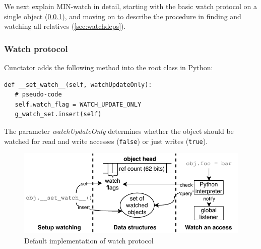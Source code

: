 \documentclass[sigconf]{acmart}\settopmatter{printfolios=true,printccs=false,printacmref=false}\setcopyright{none}
\begin{document}
We next explain MIN-watch in detail, starting with the basic watch protocol on a single object (\cref{sec:watchproto}), and moving on to describe the procedure in finding and watching all relatives (\cref{sec:watchdeps}). 


\subsubsection{Watch protocol}
\label{sec:watchproto}

Cunctator adds the following method into the root class in Python: 

\begin{lstlisting}[style=myPythonStyle]
def __set_watch__(self, watchUpdateOnly):
   # pseudo-code
   self.watch_flag = WATCH_UPDATE_ONLY
   g_watch_set.insert(self)
\end{lstlisting}

The parameter \textit{watchUpdateOnly} determines whether the object should be watched for read and write accesses (\texttt{false}) or just writes (\texttt{true}).


\begin{figure}
    \centering
    \includegraphics[width=\columnwidth]{figure/__watch__.pdf}
    \caption{Default implementation of watch protocol}
    \label{fig:watchproto}
\end{figure}
\end{document}
